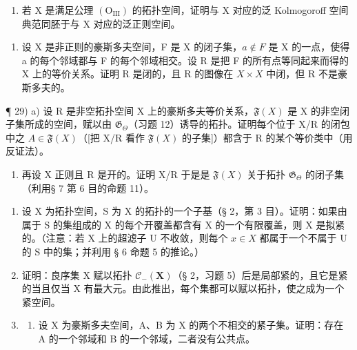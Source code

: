 \begin{enumerate}
\def\labelenumi{\alph{enumi})}
\setcounter{enumi}{3}
\tightlist
\item
  若 X 是满足公理 \((\mathrm{O}_{\mathrm{III}})\) 的拓扑空间，证明与 X 对应的泛 Kolmogoroff 空间典范同胚于与 X 对应的泛正则空间。
\end{enumerate}

\begin{enumerate}
\def\labelenumi{\arabic{enumi})}
\setcounter{enumi}{27}
\tightlist
\item
  设 X 是非正则的豪斯多夫空间，F 是 X 的闭子集，\(a \notin F\) 是 X 的一点，使得 a 的每个邻域都与 F 的每个邻域相交。设 R 是把 F 的所有点等同起来而得的 X 上的等价关系。证明 R 是闭的，且 R 的图像在 \(X \times X\) 中闭，但 R 不是豪斯多夫的。
\end{enumerate}

¶ 29) a) 设 R 是非空拓扑空间 X 上的豪斯多夫等价关系，\(\mathfrak{F}(X)\) 是 X 的非空闭子集所成的空间，赋以由 \(\mathfrak{G}_{\Theta}\)（习题 12）诱导的拓扑。证明每个位于 X/R 的闭包中之 \(A \in \mathfrak{F}(X)\)（{[}把 X/R 看作 \(\mathfrak{F}(X)\) 的子集{]}）都含于 R 的某个等价类中（用反证法）。

\begin{enumerate}
\def\labelenumi{\alph{enumi})}
\setcounter{enumi}{1}
\tightlist
\item
  再设 X 正则且 R 是开的。证明 X/R 于是是 \(\mathfrak{F}(X)\) 关于拓扑 \(\mathfrak{G}_{\Theta}\) 的闭子集（利用§ 7 第 6 目的命题 11）。
\end{enumerate}

\BourbakiExerciseGroup

\begin{enumerate}
\def\labelenumi{\arabic{enumi})}
\item
  设 X 为拓扑空间，S 为 X 的拓扑的一个子基（§ 2，第 3 目）。证明：如果由属于 S 的集组成的 X 的每个开覆盖都含有 X 的一个有限覆盖，则 X 是拟紧的。（注意：若 X 上的超滤子 U 不收敛，则每个 \(x \in X\) 都属于一个不属于 U 的 S 中的集；并利用 § 6 命题 5 的推论。）
\item
  证明：良序集 X 赋以拓扑 \(\mathcal{C}_{-}(\mathbf{X})\)（§ 2，习题 5）后是局部紧的，且它是紧的当且仅当 X 有最大元。由此推出，每个集都可以赋以拓扑，使之成为一个紧空间。
\item
  \begin{enumerate}
  \def\labelenumii{\alph{enumii})}
  \tightlist
  \item
    设 X 为豪斯多夫空间，A、B 为 X 的两个不相交的紧子集。证明：存在 A 的一个邻域和 B 的一个邻域，二者没有公共点。
  \end{enumerate}
\end{enumerate}

